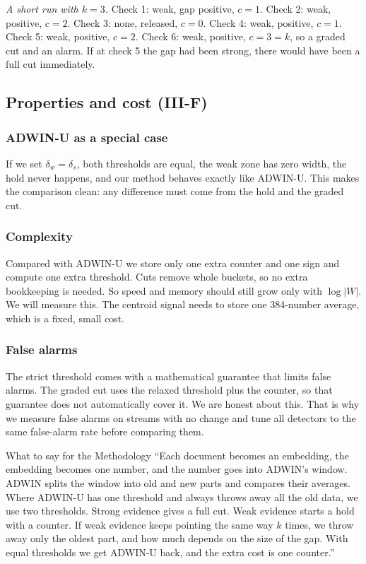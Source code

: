 \documentclass[11pt,a4paper]{article}
\begin{document}
\emph{A short run with $k=3$.} Check 1: weak, gap positive, $c=1$. Check 2: weak, positive, $c=2$. Check 3: none, released, $c=0$. Check 4: weak, positive, $c=1$. Check 5: weak, positive, $c=2$. Check 6: weak, positive, $c=3=k$, so a graded cut and an alarm. If at check 5 the gap had been strong, there would have been a full cut immediately.

\subsection{Properties and cost (III-F)}

\subsubsection*{ADWIN-U as a special case}
If we set $\delta_w=\delta_s$, both thresholds are equal, the weak zone has zero width, the hold never happens, and our method behaves exactly like ADWIN-U. This makes the comparison clean: any difference must come from the hold and the graded cut.

\subsubsection*{Complexity}
Compared with ADWIN-U we store only one extra counter and one sign and compute one extra threshold. Cuts remove whole buckets, so no extra bookkeeping is needed. So speed and memory should still grow only with $\log|W|$. We will measure this. The centroid signal needs to store one 384-number average, which is a fixed, small cost.

\subsubsection*{False alarms}
The strict threshold comes with a mathematical guarantee that limits false alarms. The graded cut uses the relaxed threshold plus the counter, so that guarantee does not automatically cover it. We are honest about this. That is why we measure false alarms on streams with no change and tune all detectors to the same false-alarm rate before comparing them.

\begin{saybox}{What to say for the Methodology}
``Each document becomes an embedding, the embedding becomes one number, and the number goes into ADWIN's window. ADWIN splits the window into old and new parts and compares their averages. Where ADWIN-U has one threshold and always throws away all the old data, we use two thresholds. Strong evidence gives a full cut. Weak evidence starts a hold with a counter. If weak evidence keeps pointing the same way $k$ times, we throw away only the oldest part, and how much depends on the size of the gap. With equal thresholds we get ADWIN-U back, and the extra cost is one counter.''
\end{saybox}
\end{document}
